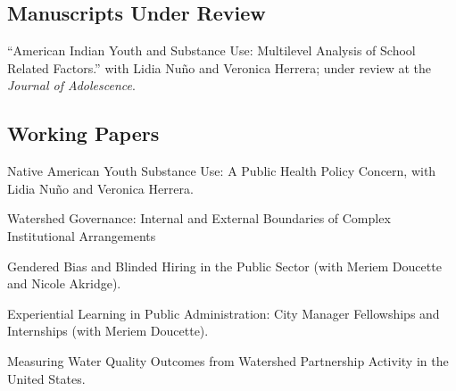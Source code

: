 \documentclass[11pt,letterpaper]{article}
\renewenvironment{itemize}{
  \begin{list}{}{
    \setlength{\leftmargin}{1.5em}
    \setlength{\itemsep}{0.25em}
    \setlength{\parskip}{0pt}
    \setlength{\parsep}{0.25em}
  }
}{
  \end{list}
}
\begin{document}
\subsection*{Manuscripts Under Review}

\begin{itemize}\leftmargin=2pt\itemindent=-15pt
	\item ``American Indian Youth and Substance Use: Multilevel Analysis of School Related Factors.'' with Lidia Nu\~no and Veronica Herrera; under review at the \emph{Journal of Adolescence}.
\end{itemize}

\subsection*{Working Papers}

\begin{itemize}\leftmargin=2pt\itemindent=-15pt

\item Native American Youth Substance Use: A Public Health Policy Concern, with Lidia Nu\~no and Veronica Herrera.
\item Watershed Governance: Internal and External Boundaries of Complex Institutional Arrangements
\item Gendered Bias and Blinded Hiring in the Public Sector (with Meriem Doucette and Nicole Akridge).
\item Experiential Learning in Public Administration: City Manager Fellowships and Internships (with Meriem Doucette).
\item Measuring Water Quality Outcomes from Watershed Partnership Activity in the United States.
\end{itemize}
\end{document}
